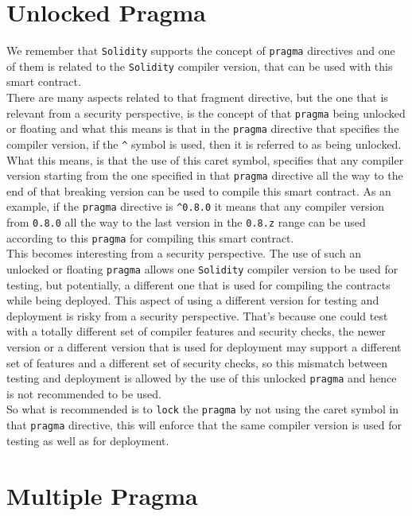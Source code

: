 \section{Unlocked Pragma}
We remember that \texttt{Solidity} supports the concept of \texttt{pragma} directives and one of them is related to the \texttt{Solidity} compiler version, that can be used with this smart contract.\\

There are many aspects related to that fragment directive, but the one that is relevant from a security perspective, is the concept of that \texttt{pragma} being unlocked or floating and what this means is that in the \texttt{pragma} directive that specifies the compiler version, if the \verb|^| symbol is used, then it is referred to as being unlocked. What this means, is that the use of this caret symbol, specifies that any compiler version starting from the one specified in that \texttt{pragma} directive all the way to the end of that breaking version can be used to compile this smart contract. As an example, if the \texttt{pragma} directive is \verb|^0.8.0| it means that any compiler version from \texttt{0.8.0} all the way to the last version in the \texttt{0.8.z} range can be used according to this \texttt{pragma} for compiling this smart contract.\\

This becomes interesting from a security perspective. The use of such an unlocked or floating \texttt{pragma} allows one \texttt{Solidity} compiler version to be used for testing, but potentially, a different one that is used for compiling the contracts while being deployed. This aspect of using a different version for testing and deployment is risky from a security perspective. That's because one could test with a totally different set of compiler features and security checks, the newer version or a different version that is used for deployment may support a different set of features and a different set of security checks, so this mismatch between testing and deployment is allowed by the use of this unlocked \texttt{pragma} and hence is not recommended to be used.\\

So what is recommended is to \texttt{lock} the \texttt{pragma} by not using the caret symbol in that \texttt{pragma} directive, this will enforce that the same compiler version is used for testing as well as for deployment.

\section{Multiple Pragma}

